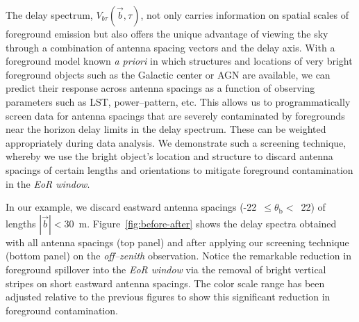 \documentclass[preprint2,iop,numberedappendix]{emulateapj}
\begin{document}
The delay spectrum, $V_{b\tau}(\vec{b},\tau)$, not only carries information on spatial scales of foreground emission but also offers the unique advantage of viewing the sky through a combination of antenna spacing vectors and the delay axis. With a foreground model known {\it a priori} in which structures and locations of very bright foreground objects such as the Galactic center or AGN are available, we can predict their response across antenna spacings as a function of observing parameters such as LST, power--pattern, etc. This allows us to programmatically screen data for antenna spacings that are severely contaminated by foregrounds near the horizon delay limits in the delay spectrum. These can be weighted appropriately during data analysis. We demonstrate such a screening technique, whereby we use the bright object's location and structure to discard antenna spacings of certain lengths and orientations to mitigate foreground contamination in the {\it EoR window}. 

In our example, we discard eastward antenna spacings (-22~$\le\theta_\textrm{b}<$~22) of lengths $|\vec{b}| < 30$~m. Figure~\ref{fig:before-after} shows the delay spectra obtained with all antenna spacings (top panel) and after applying our screening technique (bottom panel) on the {\it off--zenith} observation. Notice the remarkable reduction in foreground spillover into the {\it EoR window} via the removal of bright vertical stripes on short eastward antenna spacings. The color scale range has been adjusted relative to the previous figures to show this significant reduction in foreground contamination. 
\end{document}
